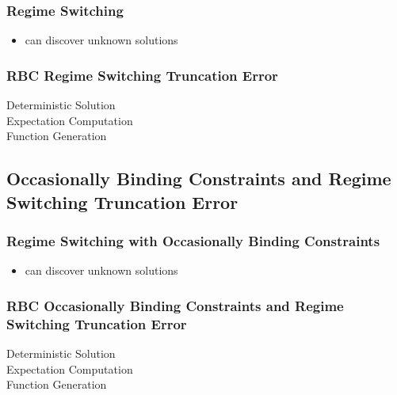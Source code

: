 \documentclass[tikz]{beamer}
\begin{document}
\begin{frame}
\frametitle{Regime Switching}
\begin{itemize}
\item can discover unknown solutions
\end{itemize}

\end{frame}


\begin{frame}
  \frametitle{RBC Regime Switching Truncation Error }
  \begin{description}
  \item[Deterministic Solution] 
  \item[Expectation Computation] 
\item[Function Generation]
  \end{description}

\end{frame}

\subsection{Occasionally Binding Constraints and Regime Switching Truncation Error }



\begin{frame}
\frametitle{Regime Switching with Occasionally Binding Constraints}
\begin{itemize}
\item can discover unknown solutions
\end{itemize}

\end{frame}


\begin{frame}
  \frametitle{RBC Occasionally Binding Constraints and Regime Switching  Truncation Error }
  \begin{description}
  \item[Deterministic Solution] 
  \item[Expectation Computation] 
\item[Function Generation]
  \end{description}

\end{frame}
\end{document}

